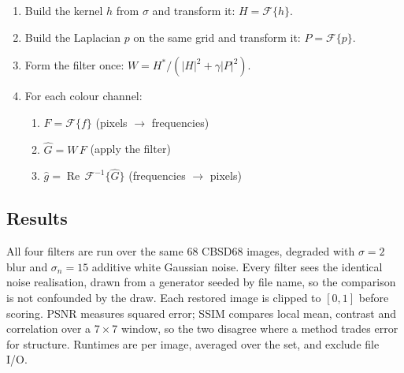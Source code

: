 \documentclass[10pt,twocolumn,letterpaper]{article}
\begin{document}
\begin{enumerate}
  \item Build the kernel $h$ from $\sigma$ and transform it: $H = \mathcal{F}\{h\}$.
  \item Build the Laplacian $p$ on the same grid and transform it: $P = \mathcal{F}\{p\}$.
  \item Form the filter once:
        $W = H^{*} / \left(\left|H\right|^{2} + \gamma\left|P\right|^{2}\right)$.
  \item For each colour channel:
    \begin{enumerate}
      \item $F = \mathcal{F}\{f\}$ \hfill (pixels $\to$ frequencies)
      \item $\hat{G} = W\,F$ \hfill (apply the filter)
      \item $\hat{g} = \operatorname{Re}\,\mathcal{F}^{-1}\{\hat{G}\}$
            \hfill (frequencies $\to$ pixels)
    \end{enumerate}
\end{enumerate}

\newpage
\clearpage
\onecolumn

\subsection*{Results}

All four filters are run over the same 68 CBSD68 images, degraded with $\sigma = 2$ blur and
$\sigma_{n} = 15$ additive white Gaussian noise. Every filter sees the identical noise
realisation, drawn from a generator seeded by file name, so the comparison is not confounded
by the draw. Each restored image is clipped to $[0,1]$ before scoring. PSNR measures squared
error; SSIM compares local mean, contrast and correlation over a $7 \times 7$ window, so the
two disagree where a method trades error for structure. Runtimes are per image, averaged
over the set, and exclude file I/O.

\vspace{1em}

\begin{center}
  
\end{center}
\end{document}
